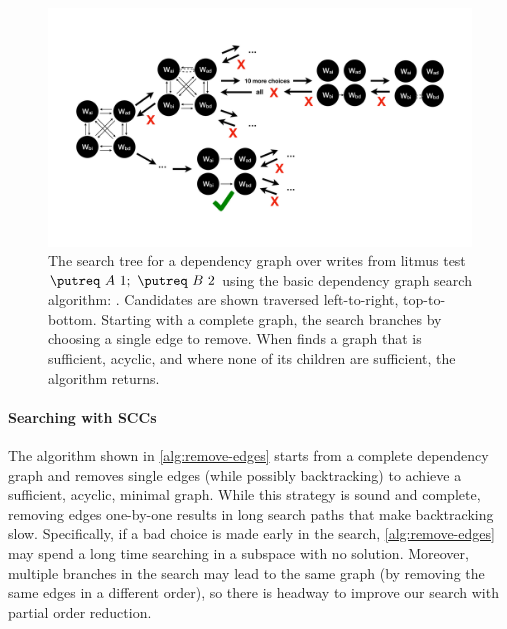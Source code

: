 \begin{figure}
  \centering
  \includegraphics[clip,trim=0cm 5cm 0cm 5cm,width=0.9\linewidth,page=1]{graph-search-graphics.pdf}
  \caption{The search tree for a dependency graph over writes from litmus test
           $ \putreq\ A\ 1;\ \putreq\ B\ 2$ using
           the basic dependency graph search algorithm: \graphsearch.
           Candidates are shown traversed left-to-right, top-to-bottom.
           Starting with a complete graph, the search branches by choosing a single edge to remove.
           When \graphsearch finds a graph that is sufficient, acyclic, and where none of its children
           are sufficient, the algorithm returns.\tighten}
  \label{fig:basic-search-visual}
\end{figure}

\paragraph{Searching with SCCs}
The algorithm shown in \autoref{alg:remove-edges} starts from a complete dependency graph and removes single
edges (while possibly backtracking) to achieve a sufficient, acyclic, minimal graph. While this strategy
is sound and complete, removing edges one-by-one results in long search paths that make backtracking slow.
Specifically, if a bad choice is made early in the search, \autoref{alg:remove-edges} may spend a long time
searching in a subspace with no solution. Moreover, multiple branches in the search may lead to the same graph
(by removing the same edges in a different order), so there is headway to improve our search
with partial order reduction.

